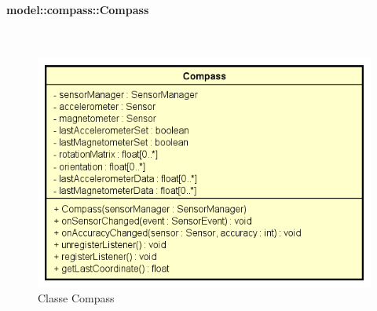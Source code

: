 \documentclass[../DefinizioneDiProdotto.tex]{subfiles}
\begin{document}
\paragraph{model::compass::Compass}
\
\begin{figure}[H]
	\centering
	\includegraphics[width=\maxwidth]{img/Compass.png}
	\caption{Classe Compass}\label{fig:model::compass::Compass} 
\end{figure}
\end{document}
